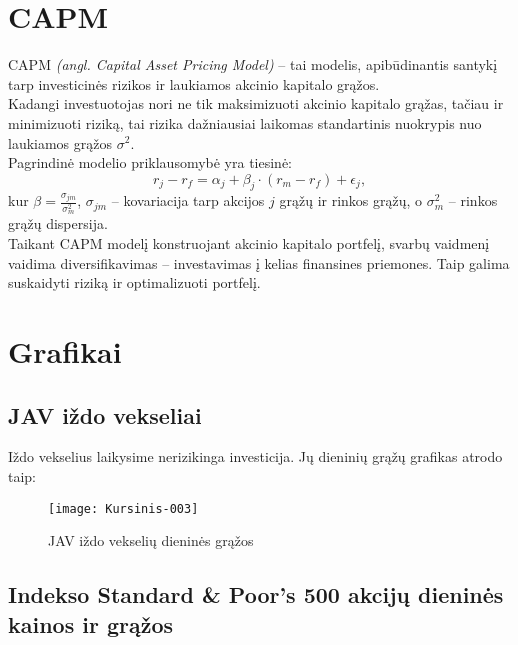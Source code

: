 \documentclass[a4paper]{article}
\begin{document}
\section{ CAPM }
CAPM \textit{(angl. Capital Asset Pricing Model)} -- tai modelis, apibūdinantis santykį tarp investicinės rizikos ir laukiamos akcinio kapitalo grąžos. \\
\indent Kadangi investuotojas nori ne tik maksimizuoti akcinio kapitalo grąžas, tačiau ir minimizuoti riziką, tai rizika dažniausiai laikomas standartinis nuokrypis nuo laukiamos grąžos $ {\sigma}^2 $.\\
\indent Pagrindinė modelio priklausomybė yra tiesinė:
 $$ r_j - r_f =\alpha_j + \beta_j\cdot(r_m - r_f) + \epsilon_j, $$ 
kur $ \beta  =\frac{\sigma_{jm}}{\sigma^2_m} $, $ \sigma_{jm} $ -- kovariacija tarp akcijos $ j $ grąžų ir rinkos grąžų, o $ \sigma^2_m $ -- rinkos grąžų dispersija.\\
\indent Taikant CAPM modelį konstruojant akcinio kapitalo portfelį, svarbų vaidmenį vaidima diversifikavimas -- investavimas į kelias finansines priemones. Taip galima suskaidyti riziką ir optimalizuoti portfelį.
  

\section{Grafikai}
\subsection{JAV iždo vekseliai}

Iždo vekselius laikysime nerizikinga investicija.
Jų dieninių grąžų grafikas atrodo taip: \\

\begin{Schunk}
\end{Schunk}
\begin{figure}[H]
  \centering
\texttt{[image: Kursinis-003]}
  \caption{JAV iždo vekselių dieninės grąžos}
  \label{fig:1}
\end{figure}
           

\subsection{Indekso Standard \& Poor's 500 akcijų dieninės kainos ir grąžos}
\end{document}
